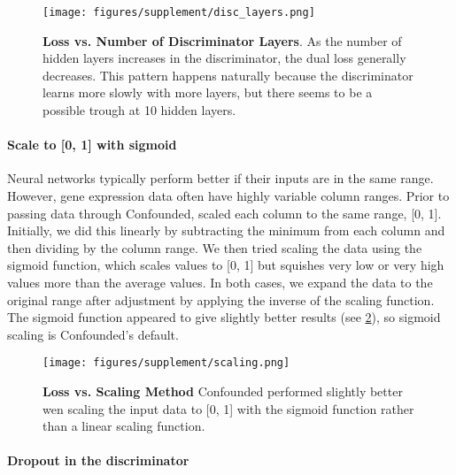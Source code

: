 \documentclass{article}
\begin{document}
\begin{figure}
	\centering
	\texttt{[image: figures/supplement/disc\_layers.png]}
	\caption{\textbf{Loss vs. Number of Discriminator Layers}.
	As the number of hidden layers increases in the discriminator, the dual loss generally decreases.
	This pattern happens naturally because the discriminator learns more slowly with more layers, but there seems to be a possible trough at 10 hidden layers.
	}
	\label{fig:disc}
\end{figure}

\paragraph{Scale to [0, 1] with sigmoid}

Neural networks typically perform better if their inputs are in the same range. %
However, gene expression data often have highly variable column ranges. %
Prior to passing data through Confounded, scaled each column to the same range, [0, 1].
Initially, we did this linearly by subtracting the minimum from each column and then dividing by the column range.
We then tried scaling the data using the sigmoid function, which scales values to [0, 1] but squishes very low or very high values more than the average values.
In both cases, we expand the data to the original range after adjustment by applying the inverse of the scaling function.
The sigmoid function appeared to give slightly better results (see \figurename{} \ref{fig:scaling}), so sigmoid scaling is Confounded's default.

\begin{figure}
	\centering
	\texttt{[image: figures/supplement/scaling.png]}
	\caption{\textbf{Loss vs. Scaling Method}
	Confounded performed slightly better wen scaling the input data to [0, 1] with the sigmoid function rather than a linear scaling function.
	}
	\label{fig:scaling}
\end{figure}

\paragraph{Dropout in the discriminator}
\end{document}
